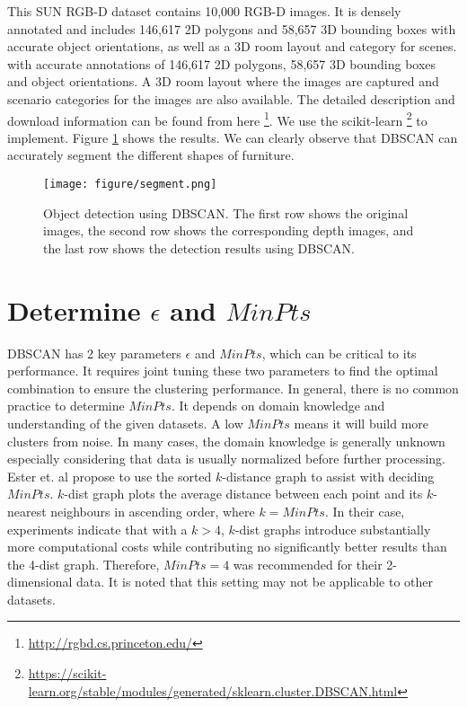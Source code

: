 This SUN RGB-D dataset contains 10,000 RGB-D images. It is densely annotated and includes 146,617 2D polygons and 58,657 3D bounding boxes with accurate object orientations, as well as a 3D room layout and category for scenes.
with accurate annotations of 146,617 2D polygons, 58,657 3D bounding boxes and object orientations. A 3D room layout where the images are captured and scenario categories for the images are also available. 
The detailed description and download information can be found from here 
\footnote{\url{http://rgbd.cs.princeton.edu/}}. We use the scikit-learn 
\footnote{\url{https://scikit-learn.org/stable/modules/generated/sklearn.cluster.DBSCAN.html}}
to implement. Figure \ref{fig:scene} shows the results. We can clearly observe 
that DBSCAN can accurately segment the different shapes of furniture. 
\begin{figure}[h!]
	\label{fig:scene}
\texttt{[image: figure/segment.png]}
\caption{Object detection using DBSCAN. The first row shows the original 
images, the second row shows the corresponding depth images, and the last row 
shows the detection results using DBSCAN.}
\end{figure}

\section{Determine $\epsilon$ and $MinPts$}

DBSCAN has 2 key parameters $\epsilon$ and $MinPts$, which can be critical to its performance. It requires joint tuning 
these two parameters to find 
the optimal combination to ensure the clustering performance. In general, 
there is no common practice to determine 
$MinPts$. It depends on domain knowledge and understanding of the given datasets. 
A low $MinPts$ means it will build more clusters from noise. In many cases, the 
domain knowledge is generally unknown especially considering that data is usually normalized 
before further processing. Ester et. al 
\cite{ester1996density} propose to use the sorted $k$-distance graph to assist with 
deciding $MinPts$. $k$-dist graph plots the average distance between each point and its $k$-nearest neighbours in ascending order, where $k=MinPts$. In their case, experiments indicate that with a  $k > 4$,  $k$-dist graphs introduce substantially more computational costs while contributing no significantly better results than the 4-dist graph.
Therefore, $MinPts = 4$ was recommended for their 2-dimensional data. It is noted that this setting may not be applicable to other datasets. 


